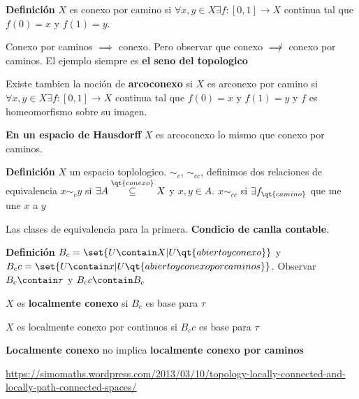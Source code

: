 \textbf{Definición} $X$ es conexo por camino si $ \forall x,y \in X \exists f: [0,1] \rightarrow X$ continua tal que $ f(0) = x $ y $ f(1) = y $.

Conexo por caminos $ \implies $ conexo. Pero observar que conexo $ \not\implies $ conexo por caminos. El ejemplo siempre es \textbf{el seno del topologico}

Existe tambien la noción de \textbf{arcoconexo} si $X$ es arconexo por camino si $ \forall x,y \in X \exists f: [0,1] \rightarrow X$ continua tal que $ f(0) = x $ y $ f(1) = y $ y $f$ es homeomorfismo sobre su imagen.

\textbf{En un espacio de Hausdorff} $X$ es arcoconexo lo mismo que conexo por caminos.

\textbf{Definición} $X$ un espacio toplologico. $ \sim_c $, $ \sim_{cc} $, definimos dos relaciones de equivalencia $ x \sim_c y  $ si $ \exists A \overset{\qt{ conexo}}{\subseteq} X $ y $ x,y \in A $. $ x \sim_{cc} $ si $ \exists f_{\qt{ camino}} $ que me une $x$ a $y$

Las clases de equivalencia para la primera.\textbf{ Condicio de canlla contable}.

\textbf{Definición} $ B_c =\set{U \contain X | U \qt{ abierto y conexo}} $ y $ B_cc = \set{U \contain x | U \qt{ abierto y conexo por caminos}} $. Observar $ B_c \contain \tau  $ y $ B_cc \contain B_c $

$ X $ es \textbf{localmente conexo} si $ B_c $ es base para $ \tau $

$ X $ es localmente conexo por continuos si $ B_cc $ es base para $ \tau $

\textbf{Localmente conexo } no implica \textbf{localmente conexo por caminos}

\url{https://simomaths.wordpress.com/2013/03/10/topology-locally-connected-and-locally-path-connected-spaces/}
